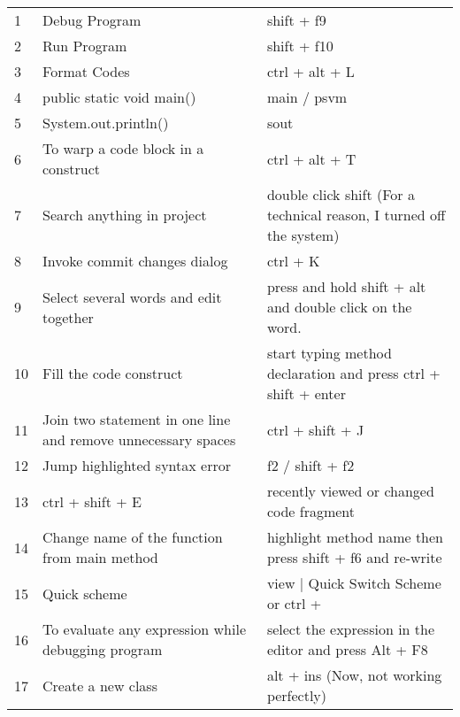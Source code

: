\documentclass[11 pt]{article}
\begin{document}

\begin{center}
	\begin{longtable}{|||| m{1 em} || m{15 em} m{17 em} ||||}
		\hline\hline
		\rowcolor{teal!20}
		\multicolumn{3}{c}{\textbf{\textsf{\textcolor{black}{IntelliJ IDEA Commands and Shortcuts}}}}\\
		\hline\hline
		1 & Debug Program & shift + f9\\
		\hline\hline
		2 & Run Program & shift + f10\\
		\hline\hline
		3 & Format Codes & ctrl + alt + L\\
		\hline\hline
		4 & public static void main() & main / psvm\\
		\hline\hline
		5 & System.out.println() & sout\\
		\hline\hline
		6 & To warp a code block in a construct & ctrl + alt + T\\
		\hline
		7 & Search anything in project & double click shift (For a technical reason, I turned off the system)\\
		\hline
		8 & Invoke commit changes dialog & ctrl + K\\
		\hline
		9 & Select several words and edit together & press and hold shift + alt and double click on the word.\\
		\hline
		10 & Fill the code construct & start typing method declaration and press ctrl + shift + enter\\
		\hline
		11 & Join two statement in one line and remove unnecessary spaces & ctrl + shift + J\\
		\hline
		12 & Jump highlighted syntax error & f2 / shift + f2\\
		\hline
		13 & ctrl + shift + E & recently viewed or changed code fragment\\
		\hline
		14 & Change name of the function from main method & highlight method name then press shift + f6 and re-write\\
		\hline
		\rowcolor{red}
		15 & Quick scheme & view | Quick Switch Scheme or ctrl +  \\
		\hline
		16 & To evaluate any expression while debugging program & select the expression in the editor and press Alt + F8\\
		\hline
		17 & Create a new class & alt + ins (Now, not working perfectly)\\

\end{longtable}
\end{center}
\end{document}
